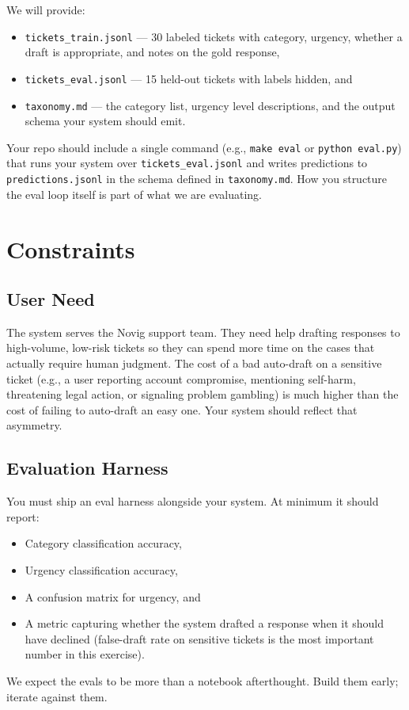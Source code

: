 \documentclass[11pt]{article}
\begin{document}
We will provide:
\begin{itemize}[noitemsep]
    \item \texttt{tickets\_train.jsonl} --- 30 labeled tickets with category, urgency, whether a draft is appropriate, and notes on the gold response,
    \item \texttt{tickets\_eval.jsonl} --- 15 held-out tickets with labels hidden, and
    \item \texttt{taxonomy.md} --- the category list, urgency level descriptions, and the output schema your system should emit.
\end{itemize}

Your repo should include a single command (e.g., \texttt{make eval} or \texttt{python eval.py}) that runs your system over \texttt{tickets\_eval.jsonl} and writes predictions to \texttt{predictions.jsonl} in the schema defined in \texttt{taxonomy.md}. How you structure the eval loop itself is part of what we are evaluating.

\section{Constraints}

\subsection{User Need}
The system serves the Novig support team. They need help drafting responses to high-volume, low-risk tickets so they can spend more time on the cases that actually require human judgment. The cost of a bad auto-draft on a sensitive ticket (e.g., a user reporting account compromise, mentioning self-harm, threatening legal action, or signaling problem gambling) is much higher than the cost of failing to auto-draft an easy one. Your system should reflect that asymmetry.

\subsection{Evaluation Harness}
You must ship an eval harness alongside your system. At minimum it should report:
\begin{itemize}[noitemsep]
    \item Category classification accuracy,
    \item Urgency classification accuracy,
    \item A confusion matrix for urgency, and
    \item A metric capturing whether the system drafted a response when it should have declined (false-draft rate on sensitive tickets is the most important number in this exercise).
\end{itemize}
We expect the evals to be more than a notebook afterthought. Build them early; iterate against them.
\end{document}
